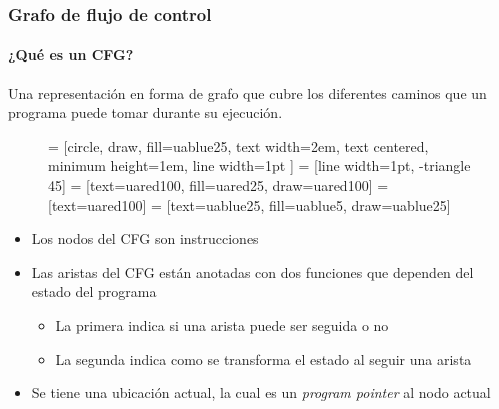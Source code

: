 \begin{frame}[fragile]
\frametitle{Grafo de flujo de control}
\framesubtitle{¿Qué es un CFG?}

Una representación en forma de grafo que cubre los diferentes caminos que un programa puede tomar durante su ejecución.


\begin{figure}
\centering
{} = [circle, draw, fill=uablue25, 
    text width=2em, text centered, minimum height=1em, line width=1pt ]
 = [line width=1pt, -triangle 45]
 = [text=uared100, fill=uared25, draw=uared100]
 = [text=uared100]
 = [text=uablue25, fill=uablue5, draw=uablue25]

\end{figure}


\begin{itemize}
\item<2->{Los nodos del CFG son instrucciones}
\item<3->{Las aristas del CFG están anotadas con dos funciones que dependen del estado del programa}
  \begin{itemize}
  \item<4->{La primera indica si una arista puede ser seguida o no}
  \item<5->{La segunda indica como se transforma el estado al seguir una arista}
  \end{itemize}
 \item<6->{Se tiene una ubicación actual, la cual es un \textit{program pointer} al nodo actual}
\end{itemize}


\end{frame}


